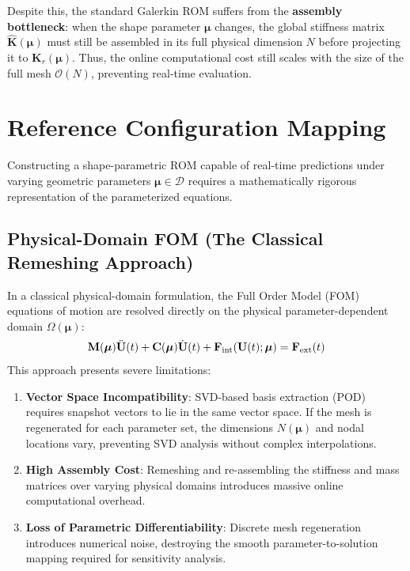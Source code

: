 Despite this, the standard Galerkin ROM suffers from the \textbf{assembly bottleneck}: when the shape parameter $\boldsymbol{\mu}$ changes, the global stiffness matrix $\hat{\mathbf{K}}(\boldsymbol{\mu})$ must still be assembled in its full physical dimension $N$ before projecting it to $\mathbf{K}_r(\boldsymbol{\mu})$. Thus, the online computational cost still scales with the size of the full mesh $\mathcal{O}(N)$, preventing real-time evaluation.


\section{Reference Configuration Mapping} \label{sec:pullback}
Constructing a shape-parametric ROM capable of real-time predictions under varying geometric parameters $\boldsymbol{\mu} \in \mathcal{D}$ requires a mathematically rigorous representation of the parameterized equations. 

\subsection{Physical-Domain FOM (The Classical Remeshing Approach)}
In a classical physical-domain formulation, the Full Order Model (FOM) equations of motion are resolved directly on the physical parameter-dependent domain $\Omega(\boldsymbol{\mu})$:
\begin{equation}
\mathbf{M}(\boldsymbol{\mu})\ddot{\mathbf{U}}(t) + \mathbf{C}(\boldsymbol{\mu})\dot{\mathbf{U}}(t) + \mathbf{F}_{\text{int}}(\mathbf{U}(t); \boldsymbol{\mu}) = \mathbf{F}_{\text{ext}}(t)
\end{equation}
This approach presents severe limitations:
\begin{enumerate}
    \item \textbf{Vector Space Incompatibility}: SVD-based basis extraction (POD) requires snapshot vectors to lie in the same vector space. If the mesh is regenerated for each parameter set, the dimensions $N(\boldsymbol{\mu})$ and nodal locations vary, preventing SVD analysis without complex interpolations.
    \item \textbf{High Assembly Cost}: Remeshing and re-assembling the stiffness and mass matrices over varying physical domains introduces massive online computational overhead.
    \item \textbf{Loss of Parametric Differentiability}: Discrete mesh regeneration introduces numerical noise, destroying the smooth parameter-to-solution mapping required for sensitivity analysis.
\end{enumerate}


